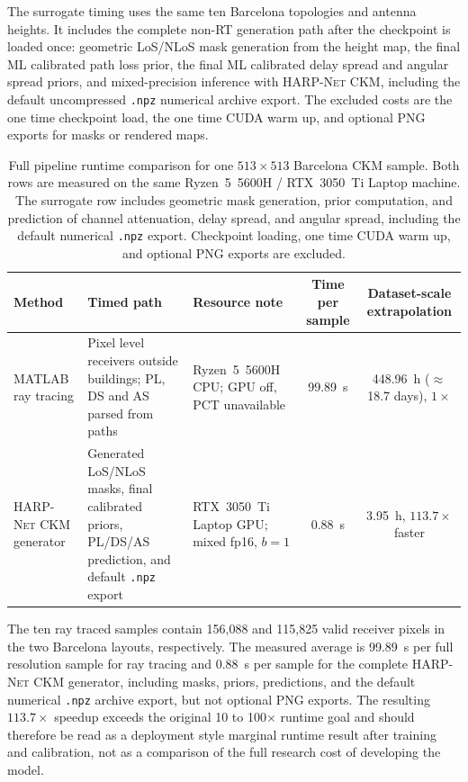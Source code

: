The surrogate timing uses the same ten Barcelona topologies and antenna
heights. It includes the complete non-RT generation path after the checkpoint is
loaded once: geometric LoS/NLoS mask generation from the height map, the final
ML calibrated path loss prior, the final ML calibrated delay spread and
angular spread priors, and mixed-precision inference with \textsc{HARP-Net CKM},
including the default uncompressed
\texttt{.npz} numerical archive export. The excluded costs are the one time
checkpoint load, the one time CUDA warm up, and optional PNG exports for masks
or rendered maps.

\begin{table}[!htbp]
\centering
\caption[Full pipeline runtime and ray tracing comparison.]
{Full pipeline runtime comparison for one \(513\times513\) Barcelona CKM sample.
Both rows are measured on the same Ryzen~5~5600H / RTX~3050~Ti Laptop machine. The surrogate row includes geometric
mask generation, prior computation, and prediction of channel attenuation, delay spread,
and angular spread, including the default numerical \texttt{.npz} export.
Checkpoint loading, one time CUDA warm up, and optional PNG exports are
excluded.}
\label{tab:inference_time_comparison}
\scriptsize
\begin{tabularx}{\textwidth}{>{\raggedright\arraybackslash}p{2.35cm}>{\raggedright\arraybackslash}X>{\raggedright\arraybackslash}p{2.25cm}cc}
\toprule
Method & Timed path & Resource note & Time per sample & Dataset-scale extrapolation \\
\midrule
MATLAB ray tracing & Pixel level receivers outside buildings; PL, DS and AS parsed from paths & Ryzen~5~5600H CPU; GPU off, PCT unavailable & \SI{99.89}{s} & \SI{448.96}{h} (\(\approx\)18.7 days), \(1\times\) \\
\textsc{HARP-Net CKM} generator & Generated LoS/NLoS masks, final calibrated priors, PL/DS/AS prediction, and default \texttt{.npz} export & RTX~3050~Ti Laptop GPU; mixed fp16, \(b=1\) & \SI{0.88}{s} & \SI{3.95}{h}, \(113.7\times\) faster \\
\bottomrule
\end{tabularx}
\end{table}
\normalsize

The ten ray traced samples contain 156{,}088 and 115{,}825 valid receiver
pixels in the two Barcelona layouts, respectively. The measured average is
\SI{99.89}{s} per full resolution sample for ray tracing and \SI{0.88}{s} per
sample for the complete \textsc{HARP-Net CKM} generator, including masks,
priors, predictions, and the default numerical \texttt{.npz} archive export,
but not optional PNG exports. The
resulting \(113.7\times\) speedup exceeds the original 10 to 100\(\times\)
runtime goal and should therefore be read as a
deployment style marginal runtime result after training and calibration, not as
a comparison of the full research cost of developing the model.


